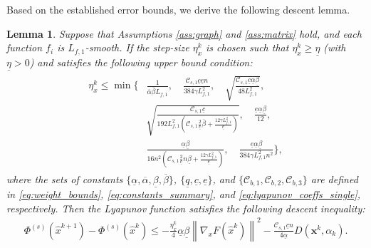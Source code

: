 \documentclass{article}
\theoremstyle{plain}
\newtheorem{lemma}[theorem]{Lemma}
\theoremstyle{definition}
\theoremstyle{remark}
\begin{document}
Based on the established error bounds, we derive the following descent lemma.
\begin{lemma}\label{lem:lyapunov_descent_single}
     Suppose that Assumptions \ref{ass:graph} and \ref{ass:matrix} hold, and each function $f_{i}$ is $L_{f,1}$-smooth.  If the step-size $\eta_x^k$ is chosen such that $\eta_x^k \geq \underline{\eta}$ (with $\underline{\eta} > 0$) and satisfies the following upper bound condition:
    \begin{align}\label{eq:step_size_conditions_single}
    \begin{aligned}
    \eta_x^{k} \leq \min\bigg\{
        & \frac{1}{\overline{\alpha}\overline{\beta}L_{f,1}}, \quad 
\frac{\mathcal{C}_{s,1} \underline{c}\underline{e}n}{384\gamma L_{f,1}^{2}}, \quad \sqrt{\frac{\mathcal{C}_{s,1} \underline{c}\underline{\alpha}\underline{\beta}}{48L_{f,1}^{2}}}, \\
        & \sqrt{\frac{\mathcal{C}_{s,1} \underline{c}}{192L_{f,1}^{2}\left(\mathcal{C}_{s,1} \frac{2}{\underline{c}}\overline{\beta}+\frac{12\gamma L_{f,1}^{2}}{\underline{e}}\right)}}, \quad 
          \frac{\underline{e}\underline{\alpha} \underline{\beta}}{12}, \\
        & \frac{\underline{\alpha}\underline{\beta}}{16n^{2}\left(\mathcal{C}_{s,1} \frac{2}{\underline{c}}n\underline{\beta}+\frac{12\gamma L_{f,1}^{2}}{\underline{e}}\right)}, \quad 
          \frac{\underline{e}\underline{\alpha} \underline{\beta}}{384\gamma L_{f,1}^{2}n^{2}}
    \bigg\},
    \end{aligned}
    \end{align}
     where the sets of constants $\{\underline{\alpha}, \overline{\alpha}, \underline{\beta}, \overline{\beta}\}$, $\{\underline{q}, \underline{c}, \underline{e}\}$, and $\{\mathcal{C}_{b,1}, \mathcal{C}_{b,2}, \mathcal{C}_{b,3}\}$ are defined in \eqref{eq:weight_bounds}, \eqref{eq:constants_summary}, and \eqref{eq:lyapunov_coeffs_single}, respectively. 
    Then the Lyapunov function satisfies the following descent inequality:
    \begin{align}
        \Phi^{(s)}({\hat{x}}^{k+1}) - \Phi^{(s)}({\hat{x}}^{k}) \leq - \frac{\eta_x^{k}}{4}\underline{\alpha}\underline{\beta} \left\| \nabla_{x}F(\hat{x}^{k}) \right\|^{2} - \frac{\mathcal{C}_{s,1} \underline{c}n}{4\underline{\alpha}} D(\mathbf{x}^{k}, \alpha_{k}).
    \end{align}
\end{lemma}
\end{document}
